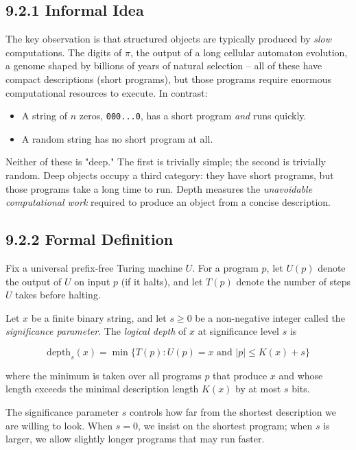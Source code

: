 \subsection{9.2.1 Informal Idea}

The key observation is that structured objects are typically produced by \textit{slow} computations. The digits of $\pi$, the output of a long cellular automaton evolution, a genome shaped by billions of years of natural selection -- all of these have compact descriptions (short programs), but those programs require enormous computational resources to execute. In contrast:

\begin{itemize}
  \item A string of $n$ zeros, \texttt{000...0}, has a short program \textit{and} runs quickly.
  \item A random string has no short program at all.
\end{itemize}

Neither of these is "deep." The first is trivially simple; the second is trivially random. Deep objects occupy a third category: they have short programs, but those programs take a long time to run. Depth measures the \textit{unavoidable computational work} required to produce an object from a concise description.

\subsection{9.2.2 Formal Definition}

Fix a universal prefix-free Turing machine $U$. For a program $p$, let $U(p)$ denote the output of $U$ on input $p$ (if it halts), and let $T(p)$ denote the number of steps $U$ takes before halting.

\begin{definition}
Let $x$ be a finite binary string, and let $s \geq 0$ be a non-negative integer called the \textit{significance parameter}. The \textit{logical depth} of $x$ at significance level $s$ is

\[
\text{depth}_s(x) = \min \{ T(p) : U(p) = x \text{ and } |p| \leq K(x) + s \} 
\]

where the minimum is taken over all programs $p$ that produce $x$ and whose length exceeds the minimal description length $K(x)$ by at most $s$ bits.

The significance parameter $s$ controls how far from the shortest description we are willing to look. When $s = 0$, we insist on the shortest program; when $s$ is larger, we allow slightly longer programs that may run faster.
\end{definition}

